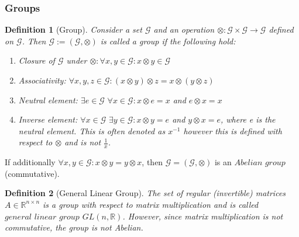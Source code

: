 \documentclass{article}
\newtheorem{definition}{Definition}[section]
\begin{document}
 	\subsubsection{Groups}
 	\begin{definition}[Group]
 		\normalfont Consider a set $\mathcal{G}$ and an operation $\otimes: \mathcal{G} \times \mathcal{G} \rightarrow \mathcal{G}$ defined on $\mathcal{G}$. Then $\mathcal{G} := (\mathcal{G}, \otimes)$ is called a group if the following hold:
 		\begin{enumerate}
 			\item Closure of $\mathcal{G}$ under $\otimes: \forall x, y \in \mathcal{G} : x \otimes y \in \mathcal{G}$
 			\item Associativity: $\forall x, y, z \in \mathcal{G}: (x \otimes y) \otimes z = x \otimes (y \otimes z)$
 			\item Neutral element: $\exists e \in \mathcal{G} \hspace{4pt} \forall x \in \mathcal{G} : x \otimes e = x$ and $e \otimes x = x$
 			\item Inverse element: $\forall x \in \mathcal{G} \hspace{4pt} \exists y \in \mathcal{G}: x \otimes y = e$ and $y \otimes x = e$, where e is the neutral element. This is often denoted as $x^{-1}$ however this is defined with respect to $\otimes$ and is not $\frac{1}{x}$.
 		\end{enumerate}
 	\end{definition}
 	If additionally $\forall x, y \in \mathcal{G}: x \otimes y = y \otimes x$, then $\mathcal{G} = (\mathcal{G}, \otimes)$ is an $\textit{Abelian group}$ (commutative). 
 	\begin{definition}[General Linear Group]
 		\normalfont The set of regular (invertible) matrices $A \in \mathbb{R}^{n \times n}$ is a group with respect to matrix multiplication and is called $\textit{general linear group}$ $\textit{GL}(n, \mathbb{R})$. However, since matrix multiplication is not commutative, the group is not Abelian.  
 	\end{definition}
\end{document}
